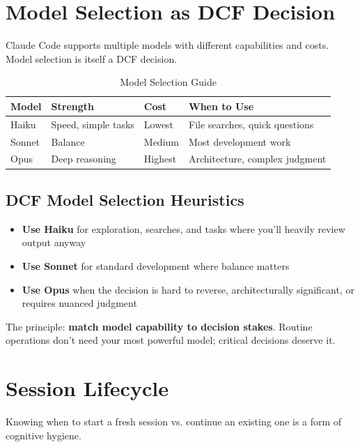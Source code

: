 \section{Model Selection as DCF Decision}

Claude Code supports multiple models with different capabilities and costs. Model selection is itself a DCF decision.

\begin{table}[H]
\centering
\begin{tabular}{llll}
\toprule
\textbf{Model} & \textbf{Strength} & \textbf{Cost} & \textbf{When to Use} \\
\midrule
Haiku & Speed, simple tasks & Lowest & File searches, quick questions \\
Sonnet & Balance & Medium & Most development work \\
Opus & Deep reasoning & Highest & Architecture, complex judgment \\
\bottomrule
\end{tabular}
\caption{Model Selection Guide}
\end{table}

\subsection{DCF Model Selection Heuristics}

\begin{itemize}
    \item \textbf{Use Haiku} for exploration, searches, and tasks where you'll heavily review output anyway
    \item \textbf{Use Sonnet} for standard development where balance matters
    \item \textbf{Use Opus} when the decision is hard to reverse, architecturally significant, or requires nuanced judgment
\end{itemize}

The principle: \textbf{match model capability to decision stakes}. Routine operations don't need your most powerful model; critical decisions deserve it.

\section{Session Lifecycle}\label{sec:session-lifecycle}

Knowing when to start a fresh session vs. continue an existing one is a form of cognitive hygiene.

